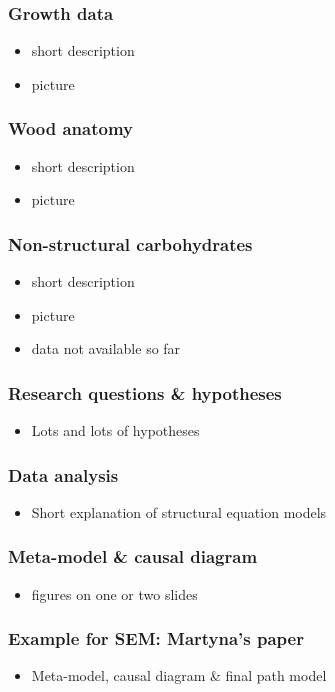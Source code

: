 \documentclass[usepdftitle=false]{beamer}
\begin{document}
\begin{frame}
	\frametitle{Growth data}
	\begin{itemize}
		\item short description
		\item picture
	\end{itemize}
\end{frame}

\begin{frame}
	\frametitle{Wood anatomy}
	\begin{itemize}
		\item short description
		\item picture
	\end{itemize}
\end{frame}

\begin{frame}
	\frametitle{Non-structural carbohydrates}
	\begin{itemize}
		\item short description
		\item picture
		\item data not available so far
	\end{itemize}
\end{frame}

\begin{frame}
	\frametitle{Research questions \& hypotheses}
	\begin{itemize}
		\item Lots and lots of hypotheses
	\end{itemize}
\end{frame}

\begin{frame}
	\frametitle{Data analysis}
	\begin{itemize}
		\item Short explanation of structural equation models		
	\end{itemize}
\end{frame}

\begin{frame}
	\frametitle{Meta-model \& causal diagram}
	\begin{itemize}
		\item figures on one or two slides		
	\end{itemize}
\end{frame}

\begin{frame}
	\frametitle{Example for SEM: Martyna's paper}
	\begin{itemize}
		\item Meta-model, causal diagram \& final path model	
	\end{itemize}
\end{frame}
\end{document}
